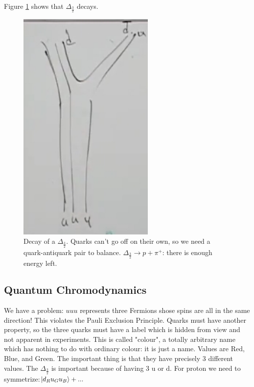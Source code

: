 \documentclass[]{article}
\begin{document}
Figure \ref{fig:decay:dalta} shows that $\Delta_\frac{3}{2}$ decays.

\begin{figure}[H]
	\begin{center}
		\caption[Decay of a $\Delta_\frac{3}{2}$]{Decay of a $\Delta_\frac{3}{2}$. Quarks can't go off on their own, so we need a quark-antiquark pair to balance. $\Delta_\frac{3}{2}\rightarrow p +\pi^+$: there is enough energy left.}\label{fig:decay:dalta}
		\includegraphics[width=0.6\textwidth]{2-2-Delta-decay}
	\end{center}
\end{figure}

\subsection{Quantum Chromodynamics}

We have a problem: $uuu$ represents three Fermions shose spins are all in the same direction! This violates the Pauli Exclusion Principle. Quarks must have another property, so the three quarks must have a label which is hidden from view and not apparent in experiments. This is called "colour", a totally arbitrary name which has nothing to do with ordinary colour: it is just a name. Values are Red, Blue, and Green. The important thing is that they have precisely 3 different values. The  $\Delta_\frac{3}{2}$ is important because of having 3 u or d. For proton we need to symmetrize:$\ket{d_R u_G u_B}+...$
\end{document}
